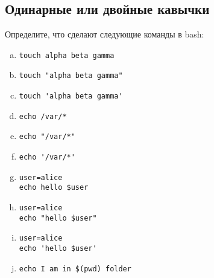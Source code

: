 \documentclass{article}
\begin{document}
\subsection{Одинарные или двойные кавычки}
Определите, что сделают следующие команды в bash:
\begin{multicols}{2}
\begin{enumerate}[(a)]
\item \begin{verbatim}
touch alpha beta gamma
\end{verbatim}

\item \begin{verbatim}
touch "alpha beta gamma"
\end{verbatim}

\item \begin{verbatim}
touch 'alpha beta gamma'
\end{verbatim}

\item \begin{verbatim}
echo /var/*
\end{verbatim}

\item \begin{verbatim}
echo "/var/*"
\end{verbatim}

\item \begin{verbatim}
echo '/var/*'
\end{verbatim}

\item \begin{verbatim}
user=alice
echo hello $user
\end{verbatim}

\item \begin{verbatim}
user=alice
echo "hello $user"
\end{verbatim}

\item \begin{verbatim}
user=alice
echo 'hello $user'
\end{verbatim}

\vfill\null
\columnbreak

\item \begin{verbatim}
echo I am in $(pwd) folder
\end{verbatim}


\end{enumerate}
\end{multicols}
\end{document}
